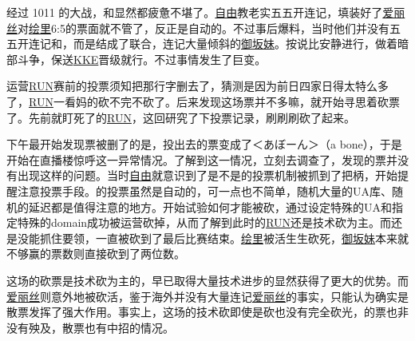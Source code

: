 
经过 1011 的大战，和显然都疲惫不堪了。\uline{自由}教老实五五开连记，填装好了\uline{爱丽丝}对\uline{绘里}6:5的票面就不管了，反正是自动的。不过事后爆料，当时他们并没有五五开连记和，而是结成了联合，连记大量倾斜的\uline{御坂妹}。按说比安静进行，做着暗部斗争，保送\uline{KKE}晋级就行。不过事情发生了巨变。

运营\uline{RUN}赛前的投票须知把那行字删去了，猜测是因为前日四家日得太特么多了，\uline{RUN}一看妈的砍不完不砍了。后来发现这场票并不多嘛，就开始寻思着砍票了。先前就盯死了的\uline{RUN}，这回研究了下投票记录，刷刷刷砍了起来。

下午最开始发现票被删了的是，投出去的票变成了{\mincho ＜あぼーん＞}（a bone），于是开始在直播楼惊呼这一异常情况。了解到这一情况，立刻去调查了，发现的票并没有出现这样的问题。当时\uline{自由}就意识到了是不是的投票机制被抓到了把柄，开始提醒注意投票手段。的投票虽然是自动的，可一点也不简单，随机大量的UA库、随机的延迟都是值得注意的地方。开始试验如何才能被砍，通过设定特殊的UA和指定特殊的domain成功被运营砍掉，从而了解到此时的\uline{RUN}还是技术砍为主。而还是没能抓住要领，一直被砍到了最后比赛结束。\uline{绘里}被活生生砍死，\uline{御坂妹}本来就不够赢的票数则直接砍到了两位数。

这场的砍票是技术砍为主的，早已取得大量技术进步的显然获得了更大的优势。而\uline{爱丽丝}则意外地被砍活，鉴于海外并没有大量连记\uline{爱丽丝}的事实，只能认为确实是散票发挥了强大作用。事实上，这场的技术砍即使是砍也没有完全砍光，的票也非没有殃及，散票也有中招的情况。

